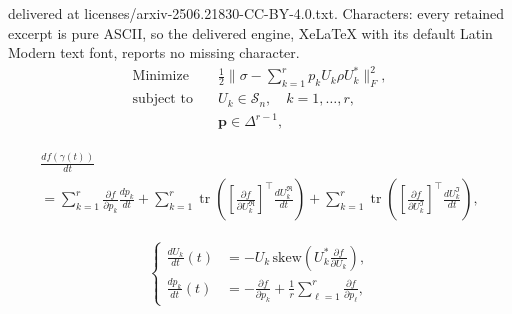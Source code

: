 \documentclass[10pt,a4paper]{amsart}
\begin{document}
delivered at licenses/arxiv-2506.21830-CC-BY-4.0.txt. Characters: every retained excerpt is pure ASCII, so the delivered engine, XeLaTeX with its default Latin Modern text font, reports no missing character.
    \begin{subequations}\label{eq:optimization}
    \begin{align}
    \text{Minimize} & \quad \frac{1}{2} \| \sigma - \sum_{k=1}^r p_k U_k \rho U_k^* \|_F^2, \\
    \text{subject to} & \quad U_k \in \mathcal{S}_n, \quad k = 1, \ldots, r, \\
    & \quad \mathbf{p} \in \Delta^{r-1},
    \end{align}
    \end{subequations}

    \begin{align}\label{eq:DFT}
    \begin{array}{l}
    \frac{d f(\gamma(t))}{dt}\\
    = %
    \sum_{k=1}^{r} \frac{\partial f}{\partial p_k} \frac{d p_k}{dt} 
    + \sum_{k=1}^{r} \operatorname{tr}\left(\left[\frac{\partial f}{\partial U_k^\mathfrak{R}}\right]^\top \frac{d U_k^\mathfrak{R}}{dt} \right) 
    + \sum_{k=1}^{r} \operatorname{tr}\left(\left[\frac{\partial f}{\partial U_k^\mathfrak{I}}\right]^\top \frac{d U_k^\mathfrak{I}}{dt} \right),%
    \end{array}
    \end{align}

    \begin{equation} \label{eq:dyflow}
    \left \{
    \begin{aligned}
        \frac{dU_k}{dt}(t) &= -U_k \, \mathrm{skew}\left(U_k^* \frac{\partial f}{\partial U_k}\right), \\ 
        \frac{dp_k}{dt}(t) &= -\frac{\partial f}{\partial p_k} + \frac{1}{r} \sum_{\ell=1}^r \frac{\partial f}{\partial p_\ell},
    \end{aligned}
    \right .
    \end{equation}
\end{document}

